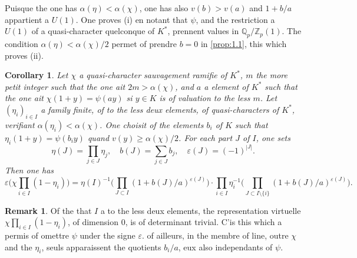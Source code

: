 \documentclass[12pt,a4paper]{article}
\theoremstyle{plain}
\newtheorem{corollary}[theorem]{Corollary}
\theoremstyle{definition}
\newtheorem{remark}[theorem]{Remark}
\theoremstyle{remark}
\newcommand{\bQ}{\mathbb{Q}}
\newcommand{\bZ}{\mathbb{Z}}
\begin{document}
Puisque the one has $\alpha(\eta) < \alpha(\chi)$, one has also $v(b) > v(a)$ and $1+b/a$ appartient a $U(1)$. One proves (i) en notant that $\psi$, and the restriction a $U(1)$ of a quasi-character quelconque of $K^*$, prennent values in $\bQ_p/\bZ_p(1)$. The condition $\alpha(\eta) < \alpha(\chi)/2$ permet of prendre $b = 0$ in \ref{prop:1.1}, this which proves (ii).

\begin{corollary}\label{cor:1.4}
Let $\chi$ a quasi-character sauvagement ramifie of $K^*$, $m$ the more petit integer such that the one ait $2m > \alpha(\chi)$, and $a$ a element of $K^*$ such that the one ait $\chi(1+y) = \psi(ay)$ si $y \in K$ is of valuation to the less $m$. Let $(\eta_i)_{i \in I}$ a family finite, of to the less deux elements, of quasi-characters of $K^*$, verifiant $\alpha(\eta_i) < \alpha(\chi)$. One choisit of the elements $b_i$ of $K$ such that $\eta_i(1+y) = \psi(b_i y)$ quand $v(y) \geq \alpha(\chi)/2$. For each part $J$ of $I$, one sets
\[
\eta(J) = \prod_{j \in J} \eta_j, \quad b(J) = \sum_{j \in J} b_j, \quad \varepsilon(J) = (-1)^{|J|}.
\]
Then one has
\begin{equation}\label{eq:1.4.1}
\varepsilon\biggl(\chi \prod_{i \in I}(1-\eta_i)\biggr) = \eta(I)^{-1}\biggl(\prod_{J \subset I} (1+b(J)/a)^{\varepsilon(J)}\biggr) \cdot \prod_{i \in I} \eta_i^{-1}\biggl(\prod_{J \subset I \setminus \{i\}} (1+b(J)/a)^{\varepsilon(J)}\biggr).
\end{equation}
\end{corollary}

\begin{remark}
Of the that $I$ a to the less deux elements, the representation virtuelle $\chi \prod_{i \in I}(1-\eta_i)$, of dimension 0, is of determinant trivial. C'is this which a permis of omettre $\psi$ under the signe $\varepsilon$. of ailleurs, in the membre of line, outre $\chi$ and the $\eta_i$, seuls apparaissent the quotients $b_i/a$, eux also independants of $\psi$.
\end{remark}

\subsection{}
\label{sec:1.5}
\end{document}
